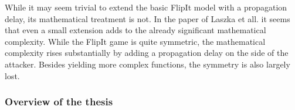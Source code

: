 While it may seem trivial to extend the basic FlipIt model with a propagation delay, its mathematical treatment is not. In the paper of Laszka et all. \citep{FlipThem} it seems that even a small extension adds to the already significant mathematical complexity. While the FlipIt game is quite symmetric, the mathematical complexity rises substantially by adding a propagation delay on the side of the attacker. Besides yielding more complex functions, the symmetry is also largely lost.

%

\subsubsection{Overview of the thesis}

